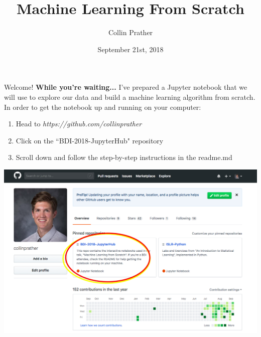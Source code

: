 \documentclass[notes]{beamer}
\title{Machine Learning From Scratch}
\author{Collin Prather}
\date{September 21st, 2018}
\begin{document}
\begin{frame}{Welcome!}
\textbf{While you're waiting...}
I've prepared a Jupyter notebook that we will use to explore our data and build a machine learning algorithm from scratch. In order to get the notebook up and running on your computer:\\
\begin{multicols}{2}
	\begin{enumerate}
		\item[1.)] Head to \textit{https://github.com/collinprather}
		\item[2.)] Click on the ``BDI-2018-JupyterHub" repository
		\item[3.)] Scroll down and follow the step-by-step instructions in the readme.md
	\end{enumerate}
	\columnbreak
	\begin{flushright}
		\includegraphics[scale=.122]{Figures/github_profile}
	\end{flushright}
\end{multicols}
\end{frame}
	
\frame{\titlepage}
\end{document}
